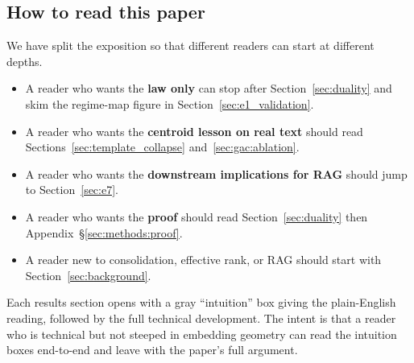 \subsection{How to read this paper}

We have split the exposition so that different readers can start at
different depths.

\begin{itemize}[leftmargin=1.8em, itemsep=2pt]
\item A reader who wants the \textbf{law only} can stop after
Section~\ref{sec:duality} and skim the regime-map figure in
Section~\ref{sec:e1_validation}.
\item A reader who wants the \textbf{centroid lesson on real text}
should read Sections~\ref{sec:template_collapse} and~\ref{sec:gac:ablation}.
\item A reader who wants the \textbf{downstream implications for RAG}
should jump to Section~\ref{sec:e7}.
\item A reader who wants the \textbf{proof} should read
Section~\ref{sec:duality} then Appendix~\S\ref{sec:methods:proof}.
\item A reader new to consolidation, effective rank, or RAG should
start with Section~\ref{sec:background}.
\end{itemize}

Each results section opens with a gray ``intuition'' box giving the
plain-English reading, followed by the full technical development.
The intent is that a reader who is technical but not steeped in
embedding geometry can read the intuition boxes end-to-end and leave
with the paper's full argument.
